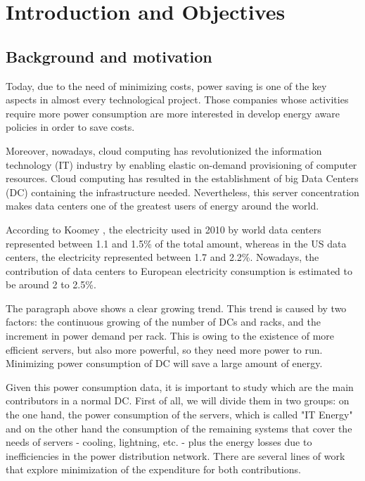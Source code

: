 \chapter{Introduction and Objectives}
\section{Background and motivation}

Today, due to the need of minimizing costs, power saving is one of the key aspects in almost every technological project. Those companies whose activities require more power consumption are more interested in develop energy aware policies in order to save costs. 

Moreover, nowadays, cloud computing has revolutionized the information technology (IT) industry by enabling elastic on-demand provisioning of computer resources. Cloud computing has resulted in the establishment of big Data Centers (DC) containing the infrastructure needed. Nevertheless, this server concentration makes data centers one of the greatest users of energy around the world.

According to Koomey \cite{koomey2011growth}, the electricity used in 2010 by world data centers represented between 1.1 and 1.5\% of the total amount, whereas in the US data centers, the electricity represented between 1.7 and 2.2\%. Nowadays, the contribution of data centers to European electricity consumption is estimated to be around 2 to 2.5\%. \cite{datoEUROPAConsumo}

The paragraph above shows a clear growing trend. This trend is caused by two factors: the continuous growing of the number of DCs and racks, and the increment in power demand per rack. This is owing to the existence of more efficient servers, but also more powerful, so they need more power to run. Minimizing power consumption of DC will save a large amount of energy.

Given this power consumption data, it is important to study which are the main contributors in a normal DC. First of all, we will divide them in two groups: on the one hand, the power consumption of the servers, which is called "IT Energy" and on the other hand the consumption of the remaining systems that cover the needs of servers - cooling, lightning, etc. - plus the energy losses due to inefficiencies in the power distribution network. There are several lines of work that explore minimization of the expenditure for both contributions. \cite{Brady2013}

